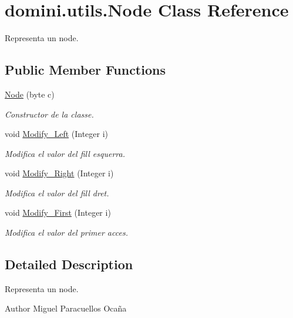 \hypertarget{classdomini_1_1utils_1_1Node}{}\section{domini.\+utils.\+Node Class Reference}
\label{classdomini_1_1utils_1_1Node}


Representa un node.  


\subsection*{Public Member Functions}
\begin{DoxyCompactItemize}
\item 
\hyperlink{classdomini_1_1utils_1_1Node_ae337ba617322158f0ac240c900350278}{Node} (byte c)
\begin{DoxyCompactList}\small\item\em Constructor de la classe. \end{DoxyCompactList}\item 
void \hyperlink{classdomini_1_1utils_1_1Node_a5a1cbd1e7f1fd78b42050f563520a709}{Modify\+\_\+\+Left} (Integer i)
\begin{DoxyCompactList}\small\item\em Modifica el valor del fill esquerra. \end{DoxyCompactList}\item 
void \hyperlink{classdomini_1_1utils_1_1Node_a58d22f8330339b6d807cdef44d0eddf6}{Modify\+\_\+\+Right} (Integer i)
\begin{DoxyCompactList}\small\item\em Modifica el valor del fill dret. \end{DoxyCompactList}\item 
void \hyperlink{classdomini_1_1utils_1_1Node_a3fe2e958308c90d24607a4e191680089}{Modify\+\_\+\+First} (Integer i)
\begin{DoxyCompactList}\small\item\em Modifica el valor del primer acces. \end{DoxyCompactList}\end{DoxyCompactItemize}


\subsection{Detailed Description}
Representa un node. 

\begin{DoxyAuthor}{Author}
Miguel Paracuellos Ocaña 
\end{DoxyAuthor}


